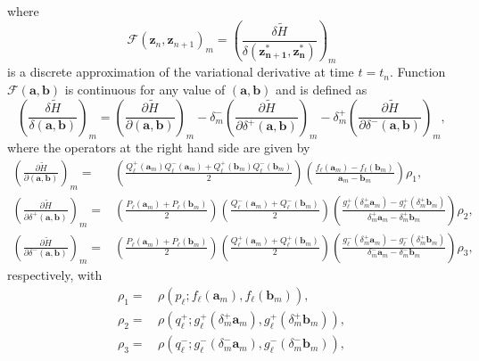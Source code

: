 \documentclass[twoside]{article}
\numberwithin{equation}{section}
\begin{document}
where
\begin{equation}\label{mathF}
\mathcal{F}(\mathbf{z}_n,\mathbf{z}_{n+1})_m=\left(\frac{\delta \widetilde H}{\delta(\mathbf{z_{n+1}^*},\mathbf{z_{n}^*})}\right)_m
\end{equation}
is a discrete approximation of the variational derivative at time $t=t_n$. Function $\mathcal{F}(\mathbf{a},\mathbf{b})$ is continuous for any value of $(\mathbf{a},\mathbf{b})$ \cite{Dahlby} and is defined as
\begin{equation}\label{discVD}
\left(\frac{\delta \widetilde H}{\delta(\mathbf{a},\mathbf{b})}\right)_m=\left(\frac{\partial \widetilde H}{\partial(\mathbf{a},\mathbf{b})}\right)_m\!\!\!\!-\delta_m^-\left(\frac{\partial \widetilde H}{\partial\delta^+(\mathbf{a},\mathbf{b})}\right)_m\!\!\!\!-\delta_m^+\left(\frac{\partial \widetilde H}{\partial\delta^-(\mathbf{a},\mathbf{b})}\right)_m,
\end{equation}
where the operators at the right hand side are given by
\begin{align}\label{op1}
\left(\frac{\partial \widetilde H}{\partial(\mathbf{a},\mathbf{b})}\right)_{\!m}\!\!\!=&\left(\frac{Q_\ell^+(\mathbf{a}_m)Q_\ell^-(\mathbf{a}_m)+Q_\ell^+(\mathbf{b}_m)Q_\ell^-(\mathbf{b}_m)}2\right)\!\left(\frac{f_\ell(\mathbf{a}_m)-f_\ell(\mathbf{b}_m)}{\mathbf{a}_m-\mathbf{b}_m}\right)\rho_1,\\\label{op2}
\left(\frac{\partial \widetilde H}{\partial\delta^+(\mathbf{a},\mathbf{b})}\right)_{\!m}\!\!\!=&\left(\frac{P_\ell(\mathbf{a}_m)+P_\ell(\mathbf{b}_m)}2\right)\!\left(\frac{Q_\ell^-(\mathbf{a}_m)+Q_\ell^-(\mathbf{b}_m)}2\right)\!\left(\frac{g_\ell^+(\delta_m^+\mathbf{a}_m)-g_\ell^+(\delta_m^+\mathbf{b}_m)}{\delta_m^+\mathbf{a}_m-\delta_m^+\mathbf{b}_m}\right)\rho_2,\\\label{op3}
\left(\frac{\partial \widetilde H}{\partial\delta^-(\mathbf{a},\mathbf{b})}\right)_{\!m}\!\!\!=&\left(\frac{P_\ell(\mathbf{a}_m)+P_\ell(\mathbf{b}_m)}2\right)\!\left(\frac{Q_\ell^+(\mathbf{a}_m)+Q_\ell^+(\mathbf{b}_m)}2\right)\!\left(\frac{g_\ell^-(\delta_m^+\mathbf{a}_m)-g_\ell^-(\delta_m^+\mathbf{b}_m)}{\delta_m^-\mathbf{a}_m-\delta_m^-\mathbf{b}_m}\right)\rho_3,
\end{align}
respectively, with
\begin{align*} 
\rho_1=&\,\rho(p_\ell;f_\ell(\mathbf{a}_m),f_\ell(\mathbf{b}_m)),\\ 
\rho_2=&\,\rho(q_\ell^+;g_\ell^+(\delta^+_m\mathbf{a}_m),g_\ell^+(\delta^+_m\mathbf{b}_m)),\\
\rho_3=&\,\rho(q_\ell^-;g_\ell^-(\delta^-_m\mathbf{a}_m),g_\ell^-(\delta^-_m\mathbf{b}_m)),
\end{align*}
\end{document}
